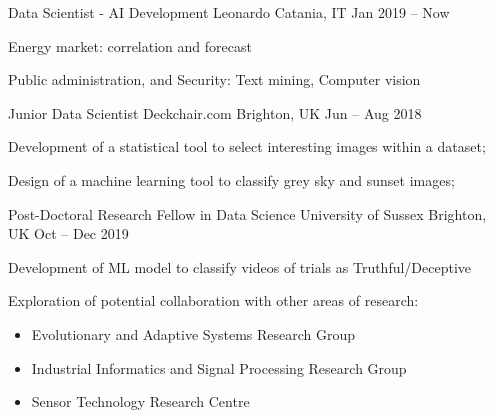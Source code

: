 
  \begin{cventries}
    \cventry
    {Data Scientist - AI Development}
    {Leonardo}    
    {Catania, IT}
    {Jan 2019 -- Now}
    {
      \begin{cvitems}
        \item {Energy market: correlation and forecast}
        \item {Public administration, and Security: Text mining, Computer vision}
      \end{cvitems}
    }

    \cventry
    {Junior Data Scientist}
    {Deckchair.com}
    {Brighton, UK}
    {Jun -- Aug 2018}
    {
      \begin{cvitems}
        \item Development of a statistical tool to select interesting images within a dataset;
        \item Design of a machine learning tool to classify grey sky and sunset images;
      \end{cvitems}
    }
  \end{cventries}

  \begin{cventries}
    \cventry
    {Post-Doctoral Research Fellow in Data Science}
    {University of Sussex}
    {Brighton, UK}
    {Oct -- Dec 2019}
    {
      \begin{cvitems}
        \item Development of ML model to classify videos of trials as Truthful/Deceptive
        \item Exploration of potential collaboration with other areas of research: 
        \begin{itemize}
          \item Evolutionary and Adaptive Systems Research Group
          \item Industrial Informatics and Signal Processing Research Group
          \item Sensor Technology Research Centre
        \end{itemize}
      \end{cvitems}
    }
  \end{cventries}


